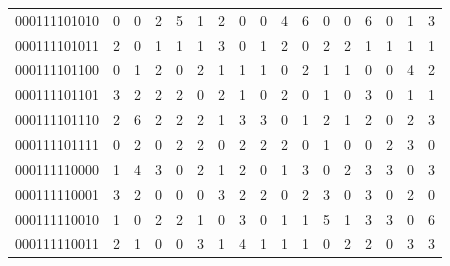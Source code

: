\documentclass[10pt,a4paper]{article}
\begin{document}
\begin{longtable}{ |c|c|c|c|c|c|c|c|c|c|c|c|c|c|c|c|c| }
    000111101010              & 0                            & 0                                & 2                            & 5                              & 1   & 2   & 0   & 0   & 4   & 6   & 0   & 0   & 6   & 0   & 1   & 3   \\
    000111101011              & 2                            & 0                                & 1                            & 1                              & 1   & 3   & 0   & 1   & 2   & 0   & 2   & 2   & 1   & 1   & 1   & 1   \\
    000111101100              & 0                            & 1                                & 2                            & 0                              & 2   & 1   & 1   & 1   & 0   & 2   & 1   & 1   & 0   & 0   & 4   & 2   \\
    000111101101              & 3                            & 2                                & 2                            & 2                              & 0   & 2   & 1   & 0   & 2   & 0   & 1   & 0   & 3   & 0   & 1   & 1   \\
    000111101110              & 2                            & 6                                & 2                            & 2                              & 2   & 1   & 3   & 3   & 0   & 1   & 2   & 1   & 2   & 0   & 2   & 3   \\
    000111101111              & 0                            & 2                                & 0                            & 2                              & 2   & 0   & 2   & 2   & 2   & 0   & 1   & 0   & 0   & 2   & 3   & 0   \\
    000111110000              & 1                            & 4                                & 3                            & 0                              & 2   & 1   & 2   & 0   & 1   & 3   & 0   & 2   & 3   & 3   & 0   & 3   \\
    000111110001              & 3                            & 2                                & 0                            & 0                              & 0   & 3   & 2   & 2   & 0   & 2   & 3   & 0   & 3   & 0   & 2   & 0   \\
    000111110010              & 1                            & 0                                & 2                            & 2                              & 1   & 0   & 3   & 0   & 1   & 1   & 5   & 1   & 3   & 3   & 0   & 6   \\
    000111110011              & 2                            & 1                                & 0                            & 0                              & 3   & 1   & 4   & 1   & 1   & 1   & 0   & 2   & 2   & 0   & 3   & 3   \\

\end{longtable}
\end{document}
